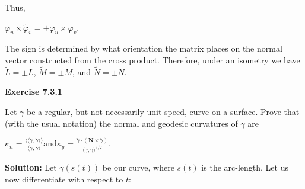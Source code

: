 \documentclass[12pt, a4paper]{article}
\begin{document}
\begin{flushleft}
\vspace{4mm}

    Thus,\par
    
\vspace{4mm}

        \centerline{$\tilde{\varphi}_u\times\tilde{\varphi}_v=\pm \varphi_u\times\varphi_v$.}
        
\vspace{4mm}

    The sign is determined by what orientation the matrix places on the normal vector constructed from the cross product. Therefore, under an isometry we have $\tilde{L}=\pm L$, $\tilde{M}=\pm M$, and $\tilde{N}=\pm N$.

\end{flushleft}



\vspace{8mm}



\begin{flushleft}

    \textbf{Exercise 7.3.1}\par
    
\vspace{4mm}

    Let $\gamma$ be a regular, but not necessarily unit-speed, curve on a surface. Prove that (with the usual notation) the normal and geodesic curvatures of $\gamma$ are\par
    
\vspace{4mm}

        \centerline{$\kappa_n=\frac{\langle\langle\dot{\gamma}, \dot{\gamma}\rangle\rangle}{\langle\dot{\gamma}, \dot{\gamma}\rangle}$\normalsize\hspace{8mm}and\hspace{8mm}$\kappa_g=\frac{\ddot{\gamma}\cdot(\mathbf{N}\times\dot{\gamma})}{\langle\dot{\gamma},\dot{\gamma}\rangle^{3/2}}$.}
        
\vspace{4mm}

    \textbf{Solution: }Let $\gamma(s(t))$ be our curve, where $s(t)$ is the arc-length. Let us now differentiate with respect to $t$:\par

    

\end{flushleft}

\newpage
\end{document}
